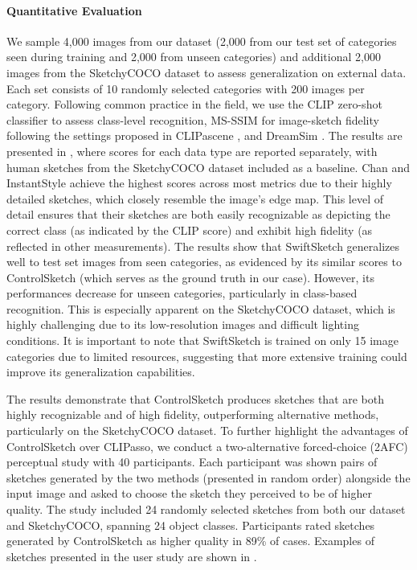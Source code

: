 \paragraph{Quantitative Evaluation} We sample 4,000 images from our dataset (2,000 from our test set of categories seen during training and 2,000 from unseen categories) and additional 2,000 images from the SketchyCOCO \cite{SketchyCOCO2020} dataset to assess generalization on external data. Each set consists of 10 randomly selected categories with 200 images per category. 
Following common practice in the field, we use the CLIP zero-shot classifier \cite{Radfordclip} to assess class-level recognition, MS-SSIM \cite{wang2003multiscale} for image-sketch fidelity following the settings proposed in CLIPascene \cite{Vinker2022CLIPasceneSS}, and DreamSim \cite{fu2023dreamsim}. 
The results are presented in , where scores for each data type are reported separately, with human sketches from the SketchyCOCO dataset included as a baseline.
Chan \etal and InstantStyle achieve the highest scores across most metrics due to their highly detailed sketches, which closely resemble the image's edge map. This level of detail ensures that their sketches are both easily recognizable as depicting the correct class (as indicated by the CLIP score) and exhibit high fidelity (as reflected in other measurements).
The results show that SwiftSketch generalizes well to test set images from seen categories, as evidenced by its similar scores to ControlSketch (which serves as the ground truth in our case). However, its performances decrease for unseen categories, particularly in class-based recognition. This is especially apparent on the SketchyCOCO dataset, which is highly challenging due to its low-resolution images and difficult lighting conditions. It is important to note that SwiftSketch is trained on only 15 image categories due to limited resources, suggesting that more extensive training could improve its generalization capabilities.

The results demonstrate that ControlSketch produces sketches that are both highly recognizable and of high fidelity, outperforming alternative methods, particularly on the SketchyCOCO dataset. To further highlight the advantages of ControlSketch over CLIPasso, we conduct a two-alternative forced-choice (2AFC) perceptual study with 40 participants. Each participant was shown pairs of sketches generated by the two methods (presented in random order) alongside the input image and asked to choose the sketch they perceived to be of higher quality. The study included 24 randomly selected sketches from both our dataset and SketchyCOCO, spanning 24 object classes. Participants rated sketches generated by ControlSketch as higher quality in 89\% of cases. Examples of sketches presented in the user study are shown in .
 











 



   
    

